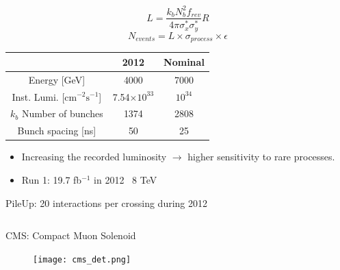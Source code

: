 \begin{frame}{}
\begin{columns}
\begin{column}{.50\textwidth}
\begin{block}{}
\begin{equation*}
  L=\frac{k_{b}N_{b}^{2}f_{rev}}{4\pi\sigma^{*}_{x}\sigma^{*}_{y}}R                                     
\end{equation*}
\begin{equation*}
  N_{events}=L\times \sigma_{process} \times \epsilon
\end{equation*}
\end{block}

\tiny{
\begin{center}
\begin{tabular}{|c|c c|}
\hline
 & 2012 & Nominal \\
\hline
Energy [GeV]& 4000 & 7000 \\
Inst. Lumi. [$\text{cm}^{-2}\text{s}^{-1}$] & 7.54$\times10^{33}$ & $10^{34}$ \\
$k_{b}$ Number of bunches & 1374 & 2808 \\
Bunch spacing [ns] & 50 & 25 \\
\hline
\end{tabular}
\end{center}
}%

\begin{block}{}
\begin{itemize}\scriptsize
\item Increasing the recorded luminosity $\to$ higher sensitivity to rare processes.
\item Run 1: 19.7 fb$^{-1}$ in 2012 \MVAt~8 TeV
\end{itemize}
\end{block}
\begin{block}{}
\scriptsize PileUp: 20 interactions per crossing during 2012
\end{block}
\end{column}
\end{columns}

\end{frame}

\begin{frame}{CMS: Compact Muon Solenoid}
\vspace{-.2cm}

\begin{figure}[!Hhtbp]
  \begin{center}
    \texttt{[image: cms\_det.png]}
  \end{center}
\end{figure}

\end{frame}


